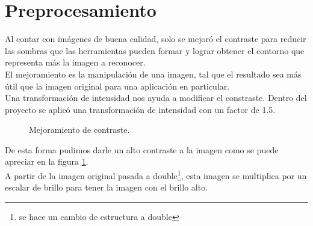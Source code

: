 \documentclass[a4paper, 11pt]{article}
\begin{document}
\pagebreak
\section{Preprocesamiento}

Al contar con imágenes de buena calidad, solo se mejoró el contraste para reducir las sombras que las herramientas pueden formar y lograr obtener el contorno que representa más la imagen a reconocer.\\

El mejoramiento es la manipulación de una imagen, tal que el resultado sea más útil que la imagen original para una aplicación en particular.\\

Una transformación de intensidad nos ayuda a modificar el constraste. Dentro del proyecto se aplicó una transformación de intensidad con un factor de 1.5.\\

\begin{figure}[ht]%
    \centering
    \qquad
    \caption{Mejoramiento de contraste.}%
    \label{fig:grayImage}%
\end{figure}

De esta forma pudimos darle un alto contraste a la imagen como se puede apreciar en la figura \ref{fig:grayImage}.\\

A partir de la imagen original pasada a double\footnote{se hace un cambio de estructura a double}, esta imagen se multiplica por un escalar de brillo para tener la imagen con el brillo alto.
\end{document}
